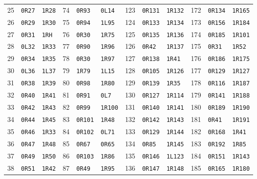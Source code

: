\begin{center}
\begin{tabular}{rll@{\qquad}rll@{\qquad}rll@{\qquad}rll}
25 & \texttt{0R27} & \texttt{1R28} & 74 & \texttt{0R93} & \texttt{0L14} & 123 & \texttt{0R131} & \texttt{1R132} & 172 & \texttt{0R134} & \texttt{1R165}\\
26 & \texttt{0R29} & \texttt{1R30} & 75 & \texttt{0R94} & \texttt{1L95} & 124 & \texttt{0R133} & \texttt{1R134} & 173 & \texttt{0R156} & \texttt{1R184}\\
27 & \texttt{0R31} & \texttt{1RH} & 76 & \texttt{0R30} & \texttt{1R75} & 125 & \texttt{0R135} & \texttt{1R136} & 174 & \texttt{0R185} & \texttt{1R101}\\
28 & \texttt{0L32} & \texttt{1R33} & 77 & \texttt{0R90} & \texttt{1R96} & 126 & \texttt{0R42} & \texttt{1R137} & 175 & \texttt{0R31} & \texttt{1R52}\\
29 & \texttt{0R34} & \texttt{1R35} & 78 & \texttt{0R30} & \texttt{1R97} & 127 & \texttt{0R138} & \texttt{1R41} & 176 & \texttt{0R186} & \texttt{1R175}\\
30 & \texttt{0L36} & \texttt{1L37} & 79 & \texttt{1R79} & \texttt{1L15} & 128 & \texttt{0R105} & \texttt{1R126} & 177 & \texttt{0R129} & \texttt{1R127}\\
31 & \texttt{0R38} & \texttt{1R39} & 80 & \texttt{0R98} & \texttt{1R80} & 129 & \texttt{0R139} & \texttt{1R35} & 178 & \texttt{0R116} & \texttt{1R187}\\
32 & \texttt{0R40} & \texttt{1R41} & 81 & \texttt{0R91} & \texttt{0L7} & 130 & \texttt{0R127} & \texttt{1R114} & 179 & \texttt{0R141} & \texttt{1R188}\\
33 & \texttt{0R42} & \texttt{1R43} & 82 & \texttt{0R99} & \texttt{1R100} & 131 & \texttt{0R140} & \texttt{1R141} & 180 & \texttt{0R189} & \texttt{1R190}\\
34 & \texttt{0R44} & \texttt{1R45} & 83 & \texttt{0R101} & \texttt{1R48} & 132 & \texttt{0R142} & \texttt{1R143} & 181 & \texttt{0R41} & \texttt{1R191}\\
35 & \texttt{0R46} & \texttt{1R33} & 84 & \texttt{0R102} & \texttt{0L71} & 133 & \texttt{0R129} & \texttt{1R144} & 182 & \texttt{0R168} & \texttt{1R41}\\
36 & \texttt{0R47} & \texttt{1R48} & 85 & \texttt{0R67} & \texttt{0R65} & 134 & \texttt{0R85} & \texttt{1R145} & 183 & \texttt{0R192} & \texttt{1R85}\\
37 & \texttt{0R49} & \texttt{1R50} & 86 & \texttt{0R103} & \texttt{1R86} & 135 & \texttt{0R146} & \texttt{1L123} & 184 & \texttt{0R151} & \texttt{1R143}\\
38 & \texttt{0R51} & \texttt{1R42} & 87 & \texttt{0R49} & \texttt{1R95} & 136 & \texttt{0R147} & \texttt{1R148} & 185 & \texttt{0R165} & \texttt{1R180}\\

\end{tabular}
\end{center}

